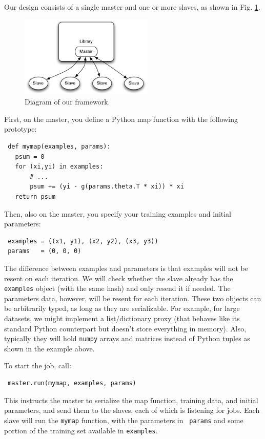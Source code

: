 \documentclass[%
        final,
        notitlepage,
        narroweqnarray,
        inline,
        ]{ieee}
\begin{document}
Our design consists of a single master and one or more slaves, as shown in
Fig. \ref{diagram}.

\begin{figure}[hb]
  \begin{center}
    \includegraphics[width=2.5in]{fwk_diagram/fwk_diagram.pdf}
  \end{center}
  \caption{Diagram of our framework.}
  \label{diagram}
\end{figure}

First, on the master, you define a Python map function with the following prototype:
\begin{verbatim}
 def mymap(examples, params):
   psum = 0
   for (xi,yi) in examples:
       # ...
       psum += (yi - g(params.theta.T * xi)) * xi
   return psum
\end{verbatim}

Then, also on the master, you specify your training examples and initial parameters:
\begin{verbatim}
 examples = ((x1, y1), (x2, y2), (x3, y3))
 params   = (0, 0, 0)
\end{verbatim}

The difference between examples and parameters is that examples will not be
resent on each iteration. We will check whether the slave already has the {\tt
  examples} object (with the same hash) and only resend it if needed. The
parameters data, however, will be resent for each iteration. These two objects
can be arbitrarily typed, as long as they are serializable. For example, for
large datasets, we might implement a list/dictionary proxy (that behaves like
its standard Python counterpart but doesn't store everything in memory). Also,
typically they will hold {\tt numpy} arrays and matrices instead of Python
tuples as shown in the example above.

To start the job, call:

\begin{verbatim}
 master.run(mymap, examples, params)
\end{verbatim}

This instructs the master to serialize the map function, training data, and
initial parameters, and send them to the slaves, each of which is listening for
jobs. Each slave will run the {\tt mymap} function, with the parameters in {\tt
  params} and some portion of the training set available in {\tt examples}.
\end{document}
